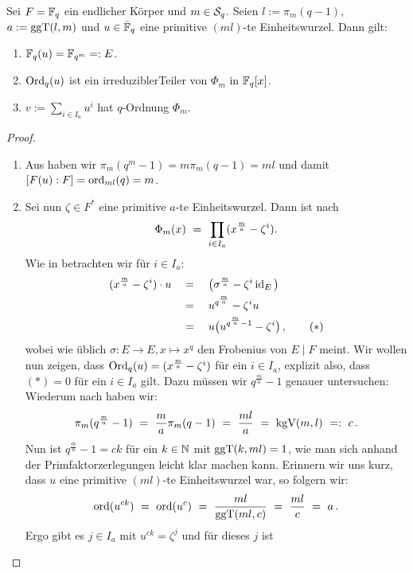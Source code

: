 \begin{satz}
  \label{satz:konstruktion_q_ordnung}
  Sei $F = \F_q$ ein endlicher Körper und $m \in \S_q$. Seien
  $l := \pi_m(q-1)$, $a := \ggT(l,m)$ und $u \in \bar\F_q$ eine primitive
  $(ml)$-te Einheitswurzel. Dann gilt:
  \begin{enumerate}
    \item $\F_q(u) = \F_{q^m} =: E$.
    \item $\Ord_q(u)$ ist ein irreduziblerTeiler von $\Phi_m$ in $\F_q[x]$.
    \item $v := \sum_{i \in I_a} u^i$ hat $q$-Ordnung $\Phi_m$.
  \end{enumerate}
\end{satz}
\begin{proof}
  \begin{enumerate}
  \item Aus  haben wir 
   $\pi_m(q^m-1) = m\pi_m(q-1) = ml$ und
    damit $[F(u):F] = \ord_{ml}(q) = m$. 
  \item Sei nun $\zeta \in F^\ast$ eine primitive $a$-te Einheitswurzel. Dann
    ist nach 
    \[ \Phi_m(x) \speq= \prod_{i\in I_a} (x^{\frac m a} - \zeta^i).\]
    Wie in  betrachten wir für $i \in I_a$:
    \begin{align*}
      (x^{\frac m a} - \zeta^i)\cdot u 
      \quad&=\quad \big( \sigma^{\frac m a} - \zeta^i \id_E \big)\\
        &=\quad u^{q^{\frac m a}} - \zeta^i u \\
        &=\quad u\big( u^{q^{\frac m a}-1} - \zeta^i \big)\,, \tag{$\ast$}
    \end{align*}
    wobei wie üblich $\sigma: E \to E, x \mapsto x^q$ den Frobenius von
    $E\mid F$ meint. Wir wollen nun zeigen, dass $\Ord_q(u) = (x^{\frac m a} -
    \zeta^i)$ für ein $i\in I_a$, explizit also, dass $(\ast) = 0$ für ein
    $i\in I_a$ gilt. Dazu müssen wir $q^{\frac m a} -1$ genauer untersuchen:
    Wiederum nach  haben wir:
    \[ \pi_m(q^{\frac m a} -1 ) \speq= \frac m a \pi_m(q-1) \speq=
      \frac{ml}{a} \speq= \kgV(m,l) \speq{=:} c\,.\]
    Nun ist $q^{\frac m a}-1 = ck$ für 
    ein $k\in\N$ mit $\ggT(k,ml) = 1$, wie man sich anhand der 
    Primfaktorzerlegungen leicht klar machen kann. Erinnern wir uns kurz, 
    dass $u$ eine primitive $(ml)$-te Einheitswurzel war, so folgern wir:
    \[ \ord(u^{ck}) \speq= \ord(u^c) \speq= \frac{ml}{\ggT(ml,c)}
      \speq= \frac{ml}{c} \speq= a\,.\]
    Ergo gibt es $j\in I_a$ mit $u^{ck} = \zeta^j$ und für dieses $j$ ist

\end{enumerate}
\end{proof}
